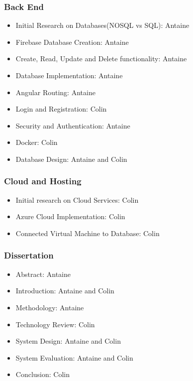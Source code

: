 \subsubsection{Back End}
\begin{itemize}
    \item Initial Research on Databases(NOSQL vs SQL): Antaine  
    \item Firebase Database Creation: Antaine   
    \item Create, Read, Update and Delete functionality: Antaine
    \item Database Implementation: Antaine
    \item Angular Routing: Antaine 
    \item Login and Registration: Colin
    \item Security and Authentication: Antaine
    \item Docker: Colin
    \item Database Design: Antaine and Colin  
\end{itemize}

\subsubsection{Cloud and Hosting}  
\begin{itemize}
  \item Initial research on Cloud Services: Colin  
  \item Azure Cloud Implementation: Colin  
  \item Connected Virtual Machine to Database: Colin  
  \end{itemize}

\subsubsection{Dissertation}
\begin{itemize}
    \item Abstract: Antaine
    \item Introduction: Antaine and Colin
    \item Methodology: Antaine
    \item Technology Review: Colin
    \item System Design: Antaine and Colin
    \item System Evaluation: Antaine and Colin
    \item Conclusion: Colin
\end{itemize}

